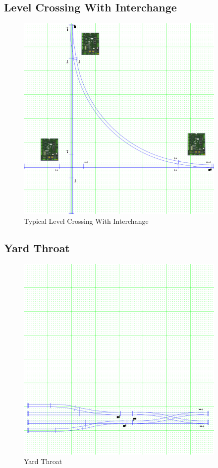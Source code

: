 \subsection{Level Crossing With Interchange}
\label{sec:LevelCrossingInterchange}
\begin{figure}[hbpt]\begin{centering}%
\includegraphics[width=4in]{ESP32S3-LevelCrossingWInterchange.png}
\caption{Typical Level Crossing With Interchange}
\label{fig:LevelCrossingWInterchange}
\end{centering}\end{figure}

\subsection{Yard Throat}
\label{sec:YardThroat}
\begin{figure}[hbpt]\begin{centering}%
\includegraphics[width=4in]{ESP32S3-YardThroat.png}
\caption{Yard Throat}
\label{fig:YardThroat}
\end{centering}\end{figure}
